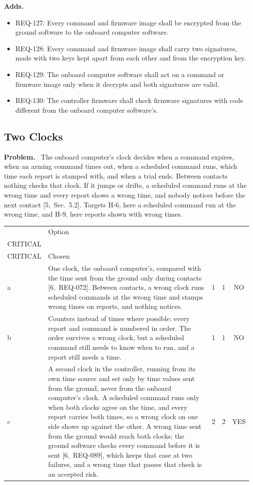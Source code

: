 \documentclass[11pt,a4paper]{article}
\makeatletter
\newcommand{\sev}[2]{\begin{tabular}[b]{@{}c@{}}#1\\{\scriptsize #2}\end{tabular}}
\newcommand{\field}[1]{\par\needspace{4\baselineskip}\smallskip\noindent\textbf{#1.}~}
\makeatother
\begin{document}
\field{Adds}
\begin{itemize}
\item REQ-127: Every command and firmware image shall be encrypted from the ground software to the onboard computer software.
\item REQ-128: Every command and firmware image shall carry two signatures, made with two keys kept apart from each other and from the encryption key.
\item REQ-129: The onboard computer software shall act on a command or firmware image only when it decrypts and both signatures are valid.
\item REQ-130: The controller firmware shall check firmware signatures with code different from the onboard computer software's.
\end{itemize}

\subsection{Two Clocks}
\label{sec:clocks}
\field{Problem} The onboard computer's clock decides when a command expires,
when an arming command times out, when a scheduled command runs, which time
each report is stamped with, and when a trial ends. Between contacts nothing
checks that clock. If it jumps or drifts, a scheduled command runs at the
wrong time and every report shows a wrong time, and nobody notices before the
next contact [5,~Sec.~5.2]. Targets H-6, here a scheduled command run at the
wrong time, and H-9, here reports shown with wrong times.

\smallskip
{\small\noindent\begin{tabularx}{\textwidth}{@{}l>{\raggedright\arraybackslash}Xccc@{}}
\toprule
 & Option & \sev{H-6}{CRITICAL} & \sev{H-9}{CRITICAL} & Chosen \\
\midrule
a & One clock, the onboard computer's, compared with the time sent from the ground only during contacts [6,~REQ-072]. Between contacts, a wrong clock runs scheduled commands at the wrong time and stamps wrong times on reports, and nothing notices. & 1 & 1 & NO \\
b & Counters instead of times where possible: every report and command is numbered in order. The order survives a wrong clock, but a scheduled command still needs to know when to run, and a report still needs a time. & 1 & 1 & NO \\
c & A second clock in the controller, running from its own time source and set only by time values sent from the ground, never from the onboard computer's clock. A scheduled command runs only when both clocks agree on the time, and every report carries both times, so a wrong clock on one side shows up against the other. A wrong time sent from the ground would reach both clocks; the ground software checks every command before it is sent [6,~REQ-089], which keeps that case at two failures, and a wrong time that passes that check is an accepted risk. & 2 & 2 & YES \\
\bottomrule
\end{tabularx}}
\end{document}
